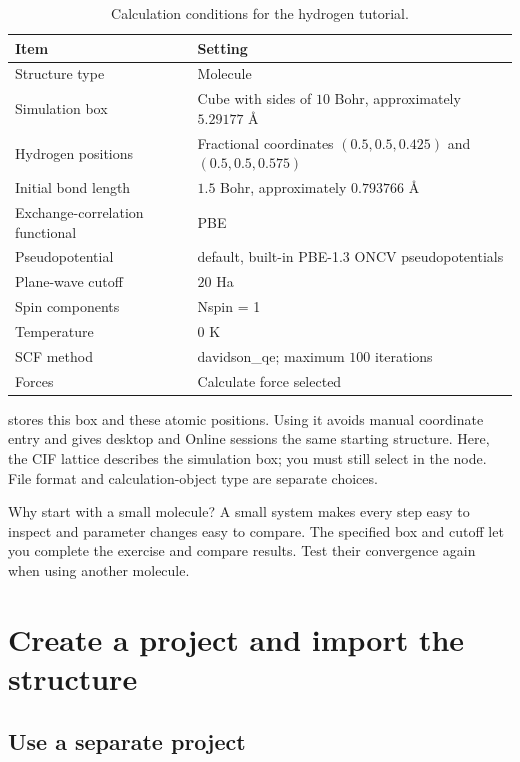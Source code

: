 \begin{table}[htbp]
\centering
\caption{Calculation conditions for the hydrogen tutorial.}
\begin{tabularx}{\linewidth}{lX}
\toprule
Item & Setting\\
\midrule
Structure type & Molecule\\
Simulation box & Cube with sides of $10$ Bohr, approximately $5.29177$ Å\\
Hydrogen positions & Fractional coordinates $(0.5,0.5,0.425)$ and $(0.5,0.5,0.575)$\\
Initial bond length & $1.5$ Bohr, approximately $0.793766$ Å\\
Exchange-correlation functional & PBE\\
Pseudopotential & default, built-in PBE-1.3 ONCV pseudopotentials\\
Plane-wave cutoff & $20$ Ha\\
Spin components & Nspin = 1\\
Temperature & $0$ K\\
SCF method & davidson\_qe; maximum $100$ iterations\\
Forces & Calculate force selected\\
\bottomrule
\end{tabularx}
\end{table}

 stores this box and these atomic positions. Using it avoids manual coordinate entry and gives desktop and Online sessions the same starting structure. Here, the CIF lattice describes the simulation box; you must still select  in the  node. File format and calculation-object type are separate choices.

\begin{notebox}{Why start with a small molecule?}
A small system makes every step easy to inspect and parameter changes easy to compare. The specified box and cutoff let you complete the exercise and compare results. Test their convergence again when using another molecule.
\end{notebox}

\section{Create a project and import the structure}

\subsection{Use a separate project}

